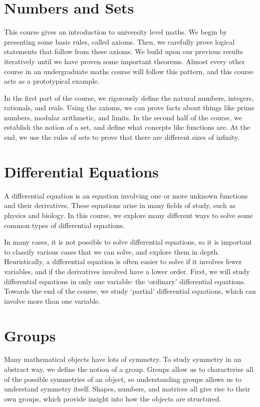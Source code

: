 \newcommand{\yearnumber}{IA}


\chapter{Numbers and Sets}
This course gives an introduction to university level maths.
We begin by presenting some basic rules, called axioms.
Then, we carefully prove logical statements that follow from these axioms.
We build upon our previous results iteratively until we have proven some important theorems.
Almost every other course in an undergraduate maths course will follow this pattern, and this course acts as a prototypical example.

In the first part of the course, we rigorously define the natural numbers, integers, rationals, and reals.
Using the axioms, we can prove facts about things like prime numbers, modular arithmetic, and limits.
In the second half of the course, we establish the notion of a set, and define what concepts like functions are.
At the end, we use the rules of sets to prove that there are different sizes of infinity.



\chapter{Differential Equations}
A differential equation is an equation involving one or more unknown functions and their derivatives.
These equations arise in many fields of study, such as physics and biology.
In this course, we explore many different ways to solve some common types of differential equations.

In many cases, it is not possible to solve differential equations, so it is important to classify various cases that we can solve, and explore them in depth.
Heuristically, a differential equation is often easier to solve if it involves fewer variables, and if the derivatives involved have a lower order.
First, we will study differential equations in only one variable: the `ordinary' differential equations.
Towards the end of the course, we study `partial' differential equations, which can involve more than one variable.



\chapter{Groups}
Many mathematical objects have lots of symmetry.
To study symmetry in an abstract way, we define the notion of a group.
Groups allow us to characterise all of the possible symmetries of an object, so understanding groups allows us to understand symmetry itself.
Shapes, numbers, and matrices all give rise to their own groups, which provide insight into how the objects are structured.

